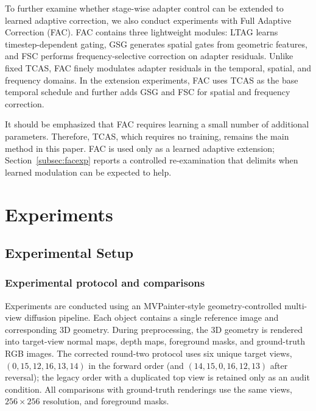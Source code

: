 \documentclass[times,twocolumn,final]{elsarticle}
\begin{document}
To further examine whether stage-wise adapter control can be extended to learned adaptive correction, we also conduct experiments with Full Adaptive Correction (FAC). FAC contains three lightweight modules: LTAG learns timestep-dependent gating, GSG generates spatial gates from geometric features, and FSC performs frequency-selective correction on adapter residuals. Unlike fixed TCAS, FAC finely modulates adapter residuals in the temporal, spatial, and frequency domains. In the extension experiments, FAC uses TCAS as the base temporal schedule and further adds GSG and FSC for spatial and frequency correction.

It should be emphasized that FAC requires learning a small number of additional parameters. Therefore, TCAS, which requires no training, remains the main method in this paper. FAC is used only as a learned adaptive extension; Section~\ref{subsec:facexp} reports a controlled re-examination that delimits when learned modulation can be expected to help.

\section{Experiments}
\label{sec:experiments}

\subsection{Experimental Setup}
\label{subsec:setup}

\subsubsection{Experimental protocol and comparisons}

Experiments are conducted using an MVPainter-style geometry-controlled multi-view diffusion pipeline. Each object contains a single reference image and corresponding 3D geometry. During preprocessing, the 3D geometry is rendered into target-view normal maps, depth maps, foreground masks, and ground-truth RGB images. The corrected round-two protocol uses six unique target views, $(0,15,12,16,13,14)$ in the forward order (and $(14,15,0,16,12,13)$ after reversal); the legacy order with a duplicated top view is retained only as an audit condition. All comparisons with ground-truth renderings use the same views, $256\times256$ resolution, and foreground masks.
\end{document}
